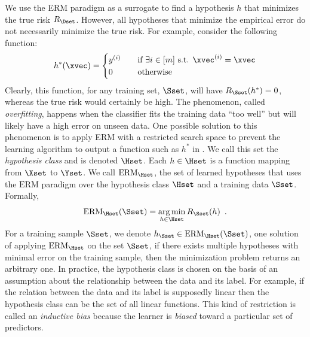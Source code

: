 We use the ERM paradigm as a surrogate to find a hypothesis $h$ that minimizes the true risk $R_\Dset$.
However, all hypotheses that minimize the empirical error do not necessarily minimize the true risk.
For example, consider the following function:
\begin{equation} \label{equation:ch2-perfect_function}
  h^*(\xvec) =
  \begin{cases}
    y^{(i)} &\quad \text{if }\exists i \in [m] \text{ s.t. } \xvec^{(i)} = \xvec \\
    0 &\quad \text{otherwise}
  \end{cases}
\end{equation}
Clearly, this function, for any training set, $\Sset$, will have $R_\Sset(h^*) = 0$, whereas the true risk would certainly be high.
The phenomenon, called \emph{overfitting}, happens when the classifier fits the training data ``too well'' but will likely have a high error on unseen data.
One possible solution to this phenomenon is to apply ERM with a restricted search space to prevent the learning algorithm to output a function such as $h^*$ in .
We call this set the \emph{hypothesis class} and is denoted $\Hset$.
Each $h \in \Hset$ is a function mapping from $\Xset$ to $\Yset$.
We call $\mathrm{ERM}_{\Hset}$, the set of learned hypotheses that uses the $\mathrm{ERM}$ paradigm over the hypothesis class $\Hset$ and a training data $\Sset$.
Formally,
\begin{equation}
  \mathrm{ERM}_{\Hset}(\Sset) = \argmin_{h \in \Hset} R_{\Sset}(h) \enspace.
\end{equation}
For a training sample $\Sset$, we denote $h_\Sset \in \mathrm{ERM}_{\Hset}(\Sset)$, one solution of applying $\mathrm{ERM}_\Hset$ on the set $\Sset$, if there exists multiple hypotheses with minimal error on the training sample, then the minimization problem returns an arbitrary one.
In practice, the hypothesis class is chosen on the basis of an assumption about the relationship between the data and its label.
For example, if the relation between the data and its label is supposedly linear then the hypothesis class can be the set of all linear functions.
This kind of restriction is called an \emph{inductive bias} because the learner is \emph{biased} toward a particular set of predictors.

